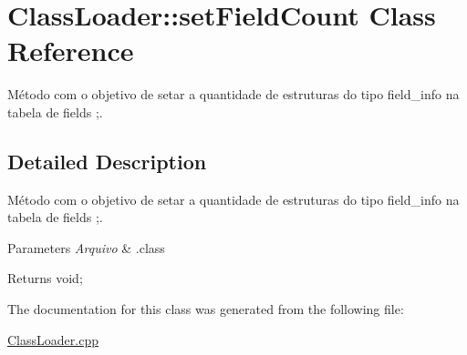 \hypertarget{class_class_loader_1_1set_field_count}{}\section{Class\+Loader\+:\+:set\+Field\+Count Class Reference}
\label{class_class_loader_1_1set_field_count}


Método com o objetivo de setar a quantidade de estruturas do tipo field\+\_\+info na tabela de fields ;.  




\subsection{Detailed Description}
Método com o objetivo de setar a quantidade de estruturas do tipo field\+\_\+info na tabela de fields ;. 


\begin{DoxyParams}{Parameters}
{\em Arquivo} & .class \\
\hline
\end{DoxyParams}
\begin{DoxyReturn}{Returns}
void; 
\end{DoxyReturn}


The documentation for this class was generated from the following file\+:\begin{DoxyCompactItemize}
\item 
\hyperlink{_class_loader_8cpp}{Class\+Loader.\+cpp}\end{DoxyCompactItemize}
